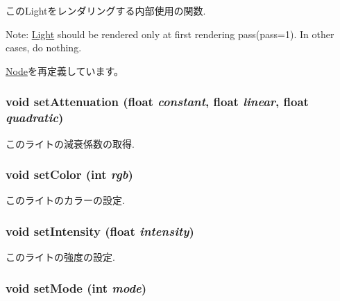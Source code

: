 このLightをレンダリングする内部使用の関数.

Note: \hyperlink{classm3g_1_1Light}{Light} should be rendered only at first rendering pass(pass=1). In other cases, do nothing. 

\hyperlink{classm3g_1_1Node_8babc8a79b78615da51161e94029eea9}{Node}を再定義しています。\hypertarget{classm3g_1_1Light_391c5cff137fc2e810f5129a5381196f}{
\subsubsection[{setAttenuation}]{\setlength{\rightskip}{0pt plus 5cm}void setAttenuation (float {\em constant}, \/  float {\em linear}, \/  float {\em quadratic})}}
\label{classm3g_1_1Light_391c5cff137fc2e810f5129a5381196f}


このライトの減衰係数の取得. \hypertarget{classm3g_1_1Light_b1f5cc0f5cc6bbbd716a526c61f1081d}{
\subsubsection[{setColor}]{\setlength{\rightskip}{0pt plus 5cm}void setColor (int {\em rgb})}}
\label{classm3g_1_1Light_b1f5cc0f5cc6bbbd716a526c61f1081d}


このライトのカラーの設定. \hypertarget{classm3g_1_1Light_ce02325cb6289c007d569c193641c468}{
\subsubsection[{setIntensity}]{\setlength{\rightskip}{0pt plus 5cm}void setIntensity (float {\em intensity})}}
\label{classm3g_1_1Light_ce02325cb6289c007d569c193641c468}


このライトの強度の設定. \hypertarget{classm3g_1_1Light_9f407b18ba6235cb96fa95611c1ea3a4}{
\subsubsection[{setMode}]{\setlength{\rightskip}{0pt plus 5cm}void setMode (int {\em mode})}}
\label{classm3g_1_1Light_9f407b18ba6235cb96fa95611c1ea3a4}


